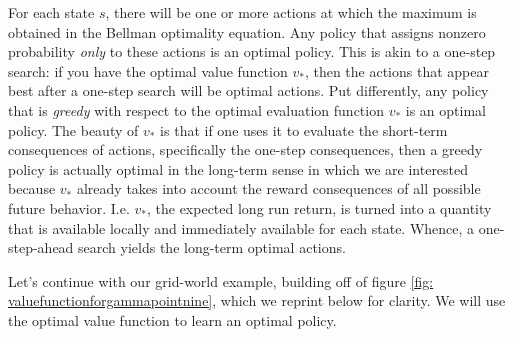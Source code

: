 \documentclass[12pt]{article}
\begin{document}
For each state $s$, there will be one or more actions at which the maximum is obtained in the Bellman optimality equation. Any policy that assigns nonzero probability \emph{only} to these actions is an optimal policy. This is akin to a one-step search: if you have the optimal value function $v_*$, then the actions that appear best after a one-step search will be optimal actions. Put differently, any policy that is \emph{greedy} with respect to the optimal evaluation function $v_*$ is an optimal policy. The beauty of $v_*$ is that if one uses it to evaluate the short-term consequences of actions, specifically the one-step consequences, then a greedy policy is actually optimal in the long-term sense in which we are interested because $v_*$ already takes into account the reward consequences of all possible future behavior. I.e. $v_*$, the expected long run return, is turned into a quantity that is available locally and immediately available for each state. Whence, a one-step-ahead search yields the long-term optimal actions.

Let's continue with our grid-world example, building off of figure \ref{fig: valuefunctionforgammapointnine}, which we reprint below for clarity. We will use the optimal value function to learn an optimal policy.
\end{document}
